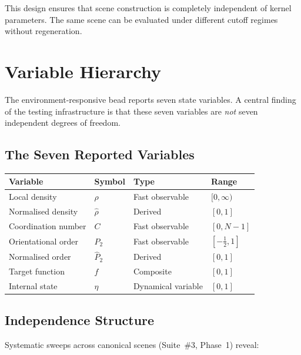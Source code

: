\documentclass[11pt]{article}
\begin{document}
This design ensures that scene construction is completely independent of
kernel parameters.  The same scene can be evaluated under different cutoff
regimes without regeneration.

\section{Variable Hierarchy}
\label{sec:hierarchy}

The environment-responsive bead reports seven state variables.  A central
finding of the testing infrastructure is that these seven variables are
\emph{not} seven independent degrees of freedom.

\subsection{The Seven Reported Variables}

\begin{center}
\begin{tabular}{llll}
    \textbf{Variable} & \textbf{Symbol} & \textbf{Type} & \textbf{Range} \\
    \midrule
    Local density           & $\rho$        & Fast observable    & $[0, \infty)$ \\
    Normalised density      & $\hat{\rho}$  & Derived            & $[0, 1]$ \\
    Coordination number     & $C$           & Fast observable    & $[0, N{-}1]$ \\
    Orientational order     & $P_2$         & Fast observable    & $[-\tfrac{1}{2}, 1]$ \\
    Normalised order        & $\hat{P}_2$   & Derived            & $[0, 1]$ \\
    Target function         & $f$           & Composite          & $[0, 1]$ \\
    Internal state          & $\eta$        & Dynamical variable & $[0, 1]$ \\
\end{tabular}
\end{center}

\subsection{Independence Structure}

Systematic sweeps across canonical scenes (Suite~\#3, Phase~1) reveal:
\end{document}
